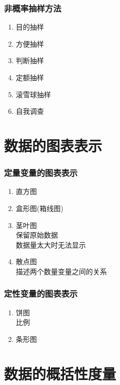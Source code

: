 \documentclass[UTF8,10pt]{book}
\begin{document}
\subsubsection{非概率抽样方法}\label{header-n13}

\begin{enumerate}
	\def\labelenumi{\arabic{enumi}.}
	\item
	目的抽样
	\item
	方便抽样
	\item
	判断抽样
	\item
	定额抽样
	\item
	滚雪球抽样
	\item
	自我调查
\end{enumerate}

\section{数据的图表表示}\label{header-n27}

\subsubsection{定量变量的图表表示}\label{header-n28}

\begin{enumerate}
	\def\labelenumi{\arabic{enumi}.}
	\item
	直方图
	\item
	盒形图(箱线图)
	\item
	茎叶图\\
	保留原始数据\\
	数据量太大时无法显示
	\item
	散点图\\
	描述两个数量变量之间的关系
\end{enumerate}

\subsubsection{定性变量的图表表示}\label{header-n38}

\begin{enumerate}
	\def\labelenumi{\arabic{enumi}.}
	\item
	饼图\\
	比例 
	\item
	条形图
\end{enumerate}

\section{数据的概括性度量}\label{header-n44}
\end{document}
